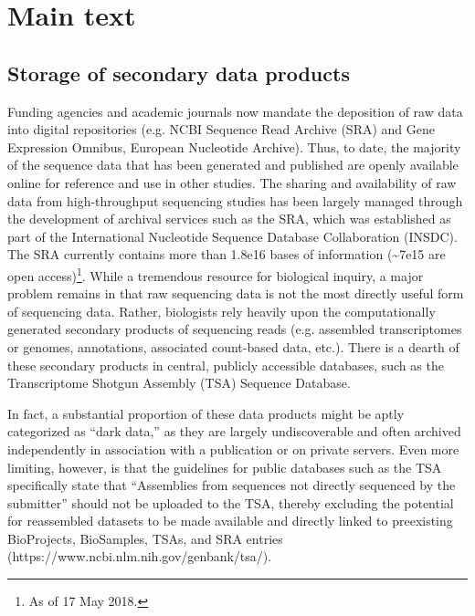 \documentclass[a4paper,num-refs]{oup-contemporary}
\begin{document}

\section{Main text}
\subsection{Storage of secondary data products}
Funding agencies and academic journals now mandate the deposition of raw data into digital repositories (e.g. NCBI Sequence Read Archive (SRA) and Gene Expression Omnibus, European Nucleotide Archive). Thus, to date, the majority of the sequence data that has been generated and published are openly available online for reference and use in other studies. The sharing and availability of raw data from high-throughput sequencing studies has been largely managed through the development of archival services such as the SRA, which was established as part of the International Nucleotide Sequence Database Collaboration (INSDC)\cite{Kodama2012, Shumway2009}. The SRA currently contains more than 1.8e16 bases of information (\textasciitilde7e15 are open access)\footnote{As of 17 May 2018.}. While a tremendous resource for biological inquiry, a major problem remains in that raw sequencing data is not the most directly useful form of sequencing data. Rather, biologists rely heavily upon the computationally generated secondary products of sequencing reads (e.g. assembled transcriptomes or genomes, annotations, associated count-based data, etc.). There is a dearth of these secondary products in central, publicly accessible databases, such as the  Transcriptome Shotgun Assembly (TSA) Sequence Database.

In fact, a substantial proportion of these data products might be aptly categorized as ``dark data,'' as they are largely undiscoverable and often archived independently in association with a publication or on private servers. Even more limiting, however, is that the guidelines for public databases such as the TSA specifically state that ``Assemblies from sequences not directly sequenced by the submitter'' should not be uploaded to the TSA, thereby excluding the potential for reassembled datasets to be made available and directly linked to preexisting BioProjects, BioSamples, TSAs, and SRA entries (https://www.ncbi.nlm.nih.gov/genbank/tsa/).
\end{document}
